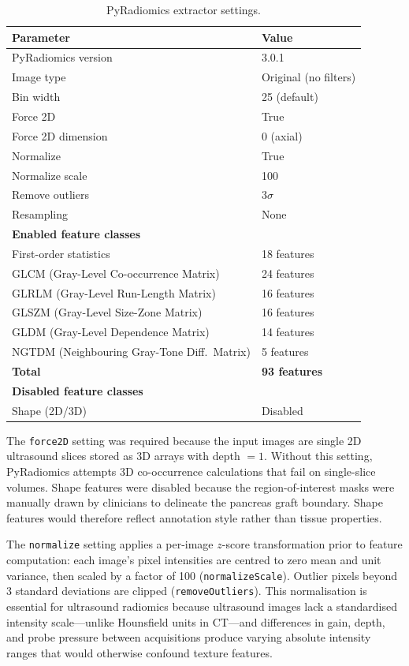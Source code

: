\begin{appendices}
\begin{table}[ht]
\centering
\caption{PyRadiomics extractor settings.}
\label{tab:pyradiomics_settings}
\small
\begin{tabular}{p{8cm}l}
\toprule
Parameter & Value \\
\midrule
PyRadiomics version & 3.0.1 \\
Image type & Original (no filters) \\
Bin width & 25 (default) \\
Force 2D & True \\
Force 2D dimension & 0 (axial) \\
Normalize & True \\
Normalize scale & 100 \\
Remove outliers & 3$\sigma$ \\
Resampling & None \\
\midrule
\multicolumn{2}{l}{\textbf{Enabled feature classes}} \\
\midrule
First-order statistics & 18 features \\
GLCM (Gray-Level Co-occurrence Matrix) & 24 features \\
GLRLM (Gray-Level Run-Length Matrix) & 16 features \\
GLSZM (Gray-Level Size-Zone Matrix) & 16 features \\
GLDM (Gray-Level Dependence Matrix) & 14 features \\
NGTDM (Neighbouring Gray-Tone Diff.\ Matrix) & 5 features \\
\midrule
\textbf{Total} & \textbf{93 features} \\
\midrule
\multicolumn{2}{l}{\textbf{Disabled feature classes}} \\
\midrule
Shape (2D/3D) & Disabled \\
\bottomrule
\end{tabular}
\end{table}

The \texttt{force2D} setting was required because the input images are single 2D ultrasound slices stored as 3D arrays with depth $= 1$. Without this setting, PyRadiomics attempts 3D co-occurrence calculations that fail on single-slice volumes. Shape features were disabled because the region-of-interest masks were manually drawn by clinicians to delineate the pancreas graft boundary. Shape features would therefore reflect annotation style rather than tissue properties.

The \texttt{normalize} setting applies a per-image $z$-score transformation prior to feature computation: each image's pixel intensities are centred to zero mean and unit variance, then scaled by a factor of 100 (\texttt{normalizeScale}). Outlier pixels beyond 3 standard deviations are clipped (\texttt{removeOutliers}). This normalisation is essential for ultrasound radiomics because ultrasound images lack a standardised intensity scale---unlike Hounsfield units in CT---and differences in gain, depth, and probe pressure between acquisitions produce varying absolute intensity ranges that would otherwise confound texture features.


\end{appendices}
